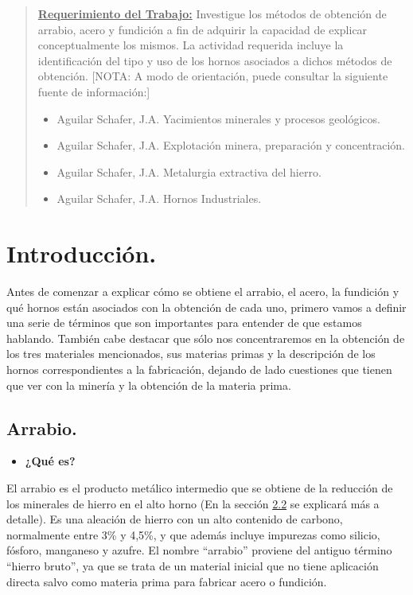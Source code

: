 \documentclass[12pt,a4paper]{article}
\begin{document}

\tableofcontents

\begin{abstract}
    \underline{\textbf{Requerimiento del Trabajo:}} Investigue los métodos de obtención de arrabio, acero y fundición a fin de adquirir la capacidad de explicar conceptualmente los mismos. La actividad requerida incluye la identificación del tipo y uso de los hornos asociados a dichos métodos de obtención. [NOTA: A modo de orientación, puede consultar la siguiente fuente de información:]
    \begin{itemize}
        \item Aguilar Schafer, J.A. Yacimientos minerales y procesos geológicos.
        \item Aguilar Schafer, J.A. Explotación minera, preparación y concentración.
        \item Aguilar Schafer, J.A. Metalurgia extractiva del hierro.
        \item Aguilar Schafer, J.A. Hornos Industriales.
    \end{itemize}
\end{abstract}

\section{Introducción.}
Antes de comenzar a explicar cómo se obtiene el arrabio, el acero, la fundición y qué hornos están asociados con la obtención de cada uno, primero vamos a definir una serie de términos que son importantes para entender de que estamos hablando. También cabe destacar que sólo nos concentraremos en la obtención de los tres materiales mencionados, sus materias primas y la descripción de los hornos correspondientes a la fabricación, dejando de lado cuestiones que tienen que ver con la minería y la obtención de la materia prima.

\subsection{Arrabio.}
\begin{itemize}
    \item \textbf{¿Qué es?}
\end{itemize}

El arrabio es el producto metálico intermedio que se obtiene de la reducción de los minerales de hierro en el alto horno (En la sección \hyperref[asociados]{2.2} se explicará más a detalle). Es una aleación de hierro con un alto contenido de carbono, normalmente entre 3\% y 4,5\%, y que además incluye impurezas como silicio, fósforo, manganeso y azufre. El nombre “arrabio” proviene del antiguo término “hierro bruto”, ya que se trata de un material inicial que no tiene aplicación directa salvo como materia prima para fabricar acero o fundición.
\end{document}
